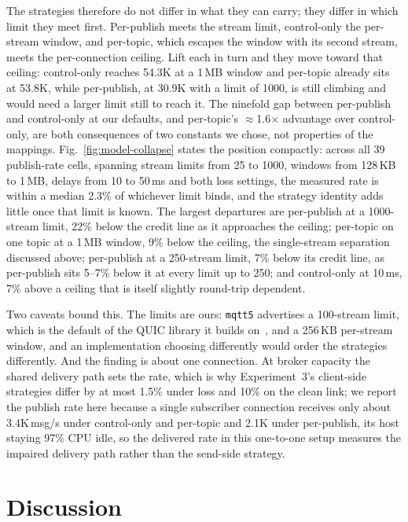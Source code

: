 \documentclass[a4paper,fleqn]{cas-dc}
\begin{document}
The strategies therefore do not differ in what they can carry; they differ in which limit they meet first. Per-publish meets the stream limit, control-only the per-stream window, and per-topic, which escapes the window with its second stream, meets the per-connection ceiling. Lift each in turn and they move toward that ceiling: control-only reaches 54.3K at a 1\,MB window and per-topic already sits at 53.8K, while per-publish, at 30.9K with a limit of 1000, is still climbing and would need a larger limit still to reach it. The ninefold gap between per-publish and control-only at our defaults, and per-topic's $\approx$1.6$\times$ advantage over control-only, are both consequences of two constants we chose, not properties of the mappings. Fig.~\ref{fig:model-collapse} states the position compactly: across all 39 publish-rate cells, spanning stream limits from 25 to 1000, windows from 128\,KB to 1\,MB, delays from 10 to 50\,ms and both loss settings, the measured rate is within a median 2.3\% of whichever limit binds, and the strategy identity adds little once that limit is known. The largest departures are per-publish at a 1000-stream limit, 22\% below the credit line as it approaches the ceiling; per-topic on one topic at a 1\,MB window, 9\% below the ceiling, the single-stream separation discussed above; per-publish at a 250-stream limit, 7\% below its credit line, as per-publish sits 5--7\% below it at every limit up to 250; and control-only at 10\,ms, 7\% above a ceiling that is itself slightly round-trip dependent.

Two caveats bound this. The limits are ours: \texttt{mqtt5} advertises a 100-stream limit, which is the default of the QUIC library it builds on~\cite{quinn}, and a 256\,KB per-stream window, and an implementation choosing differently would order the strategies differently. And the finding is about one connection. At broker capacity the shared delivery path sets the rate, which is why Experiment~3's client-side strategies differ by at most 1.5\% under loss and 10\% on the clean link; we report the publish rate here because a single subscriber connection receives only about 3.4K\,msg/s under control-only and per-topic and 2.1K under per-publish, its host staying 97\% CPU idle, so the delivered rate in this one-to-one setup measures the impaired delivery path rather than the send-side strategy.


\section{Discussion}
\label{sec:discussion}
\end{document}
